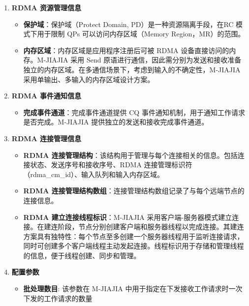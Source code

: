 {\begin{enumerate}[label=\arabic*., leftmargin=1em, align=left]
        \item \textbf{RDMA 资源管理信息}
              \begin{itemize}
                  \item \textbf{保护域}：保护域（Protect Domain, PD）是一种资源隔离手段，在RC 模式下用于限制 QPs 可以访问内存区域（Memory Region，MR）的范围。
                  \item \textbf{内存区域}：内存区域是应用程序注册后可被 RDMA 设备直接访问的内存。M-JIAJIA 采用 Send 原语进行通信，因此需分别为发送和接收准备独立的内存区域。在多通信场景下，考虑到输入的不确定性，M-JIAJIA 采用单输出、多输入的内存区域设计方案。
              \end{itemize}

        \item \textbf{RDMA 事件通知信息}
              \begin{itemize}
                  \item \textbf{完成事件通道}：完成事件通道提供 CQ 事件通知机制，用于通知工作请求是否完成。M-JIAJIA 提供独立的发送和接收完成事件通道。
              \end{itemize}

        \item \textbf{RDMA 连接管理信息}
              \begin{itemize}
                  \item \textbf{RDMA 连接管理结构}：该结构用于管理与每个连接相关的信息。包括连接状态、发送序号和接收序号、RDMA 连接管理标识符（rdma\_cm\_id）、输入队列和输入内存区域。
                  \item \textbf{RDMA 连接管理结构数组}：连接管理结构数组记录了与每个远端节点的连接信息。
                  \item \textbf{RDMA 建立连接线程标识}：M-JIAJIA 采用客户端-服务器模式建立连接。在建连阶段，节点分别创建客户端和服务器线程以完成连接。其建连方案具有独特性：每个节点至多创建一个服务器线程用于监听连接请求，同时可创建多个客户端线程主动发起连接。线程标识用于存储和管理线程的信息，便于线程创建、同步和管理。
              \end{itemize}

        \item \textbf{配置参数}
              \begin{itemize}[leftmargin=*, nosep]
                  \item \textbf{批处理数目}: 该参数在 M-JIAJIA 中用于指定在下发接收工作请求时一次下发的工作请求的数量
              \end{itemize}
    \end{enumerate}

}
